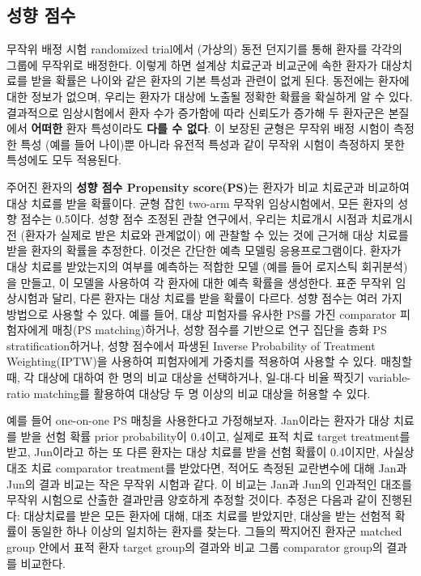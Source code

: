 \documentclass[10.5pt]{book}
\theoremstyle{definition}
\theoremstyle{definition}
\theoremstyle{definition}
\theoremstyle{remark}
\begin{document}
\subsection{성향 점수}\label{-}


무작위 배정 시험 randomized trial에서 (가상의) 동전 던지기를 통해 환자를
각각의 그룹에 무작위로 배정한다. 이렇게 하면 설계상 치료군과 비교군에
속한 환자가 대상치료를 받을 확률은 나이와 같은 환자의 기본 특성과 관련이
없게 된다. 동전에는 환자에 대한 정보가 없으며, 우리는 환자가 대상에
노출될 정확한 확률을 확실하게 알 수 있다. 결과적으로 임상시험에서 환자
수가 증가함에 따라 신뢰도가 증가해 두 환자군은 본질에서 \textbf{어떠한}
환자 특성이라도 \textbf{다를 수 없다}. 이 보장된 균형은 무작위 배정
시험이 측정한 특성 (예를 들어 나이)뿐 아니라 유전적 특성과 같이 무작위
시험이 측정하지 못한 특성에도 모두 적용된다. 

주어진 환자의 \textbf{성향 점수 Propensity score(PS)}는 환자가 비교
치료군과 비교하여 대상 치료를 받을 확률이다. \citep{rosenbaum_1983} 균형
잡힌 two-arm 무작위 임상시험에서, 모든 환자의 성향 점수는 0.5이다. 성향
점수 조정된 관찰 연구에서, 우리는 치료개시 시점과 치료개시 전 (환자가
실제로 받은 치료와 관계없이) 에 관찰할 수 있는 것에 근거해 대상 치료를
받을 환자의 확률을 추정한다. 이것은 간단한 예측 모델링 응용프로그램이다.
환자가 대상 치료를 받았는지의 여부를 예측하는 적합한 모델 (예를 들어
로지스틱 회귀분석)을 만들고, 이 모델을 사용하여 각 환자에 대한 예측
확률을 생성한다. 표준 무작위 임상시험과 달리, 다른 환자는 대상 치료를
받을 확률이 다르다. 성향 점수는 여러 가지 방법으로 사용할 수 있다. 예를
들어, 대상 피험자를 유사한 PS를 가진 comparator 피험자에게 매칭(PS
matching)하거나, 성향 점수를 기반으로 연구 집단을 층화 PS
stratification하거나, 성향 점수에서 파생된 Inverse Probability of
Treatment Weighting(IPTW)을 사용하여 피험자에게 가중치를 적용하여 사용할
수 있다. 매칭할 때, 각 대상에 대하여 한 명의 비교 대상을 선택하거나,
일-대-다 비율 짝짓기 variable-ratio matching를 활용하여 대상당 두 명
이상의 비교 대상을 허용할 수 있다. \citep{rassen_2012}
 

예를 들어 one-on-one PS 매칭을 사용한다고 가정해보자. Jan이라는 환자가
대상 치료를 받을 선험 확률 prior probability이 0.4이고, 실제로 표적 치료
target treatment를 받고, Jun이라고 하는 또 다른 환자는 대상 치료를 받을
선험 확률이 0.4이지만, 사실상 대조 치료 comparator treatment를 받았다면,
적어도 측정된 교란변수에 대해 Jan과 Jun의 결과 비교는 작은 무작위 시험과
같다. 이 비교는 Jan과 Jun의 인과적인 대조를 무작위 시험으로 산출한
결과만큼 양호하게 추정할 것이다. 추정은 다음과 같이 진행된다: 대상치료를
받은 모든 환자에 대해, 대조 치료를 받았지만, 대상을 받는 선험적 확률이
동일한 하나 이상의 일치하는 환자를 찾는다. 그들의 짝지어진 환자군
matched group 안에서 표적 환자 target group의 결과와 비교 그룹
comparator group의 결과를 비교한다.
\end{document}
